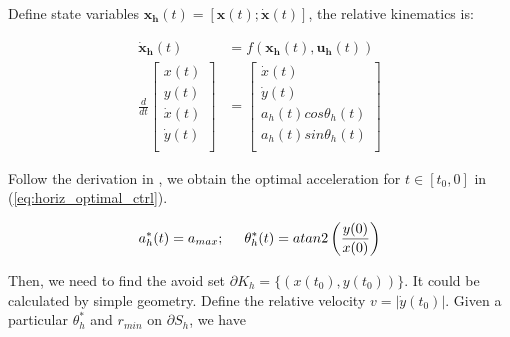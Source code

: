 \documentclass[journal,11pt,onecolumn,draftclsnofoot,]{IEEEtran}
\begin{document}
Define state variables $\boldsymbol{x_h}(t)=\left[\boldsymbol{x}(t) ; \boldsymbol{\dot{x}}(t) \right]$, the relative kinematics is:

\begin{equation}
\label{eq:2D_dyn}
\begin{split}
\boldsymbol{\dot{x}_h}(t)  &= f(\boldsymbol{x_h}(t),\boldsymbol{u_h}(t)) \\
\frac{d}{dt}
\begin{bmatrix}
x(t) \\
y(t) \\
\dot{x}(t) \\
\dot{y}(t) \\
\end{bmatrix}
&=
\begin{bmatrix}
\dot{x}(t) \\
\dot{y}(t) \\
a_h(t) cos \theta_h(t) \\
a_h(t) sin \theta_h(t) \\
\end{bmatrix}
\end{split}
\end{equation}

Follow the derivation in \cite{hoffmann2008decentralized}, we obtain the optimal acceleration for $t \in [t_0,0]$ in (\ref{eq:horiz_optimal_ctrl}). 	

\begin{equation}
\label{eq:horiz_optimal_ctrl}
\begin{split}
a_h^*(t) = a_{max}; \hspace{0.5cm}
\theta_h^*(t) = atan2 \left( \frac{y(0)}{x(0)} \right) \\
\end{split}
\end{equation}



Then, we need to find the avoid set $\partial K_h = \{ (x(t_0), y(t_0)) \}$. It could be calculated by simple geometry. Define the relative velocity $v=|\dot{y}(t_0)|$. Given a particular $\theta_h^*$ and $r_{min}$ on $\partial S_h$,  we have
\end{document}
